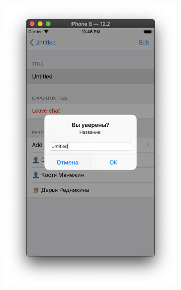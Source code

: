 \documentclass[a4paper,12pt]{article}
\begin{document}
	\begin{figure}[h!]
		\centering
		\begin{subfigure}[b]{0.3\linewidth}
			\includegraphics[width=\linewidth]{../includes/pmi/adminName.png}
		\end{subfigure}
		\begin{subfigure}[b]{0.3\linewidth}

\end{subfigure}
\end{figure}
\end{document}
